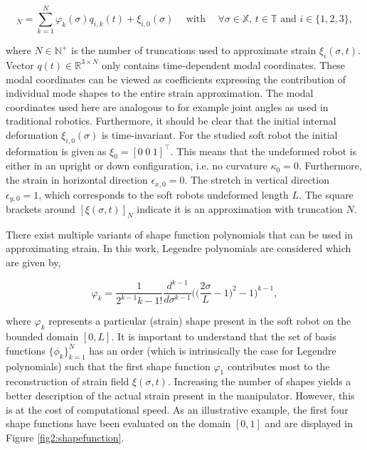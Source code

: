 \begin{equation}
    [\xi_i(\sigma,t)]_N = \sum_{k=1}^N \varphi_k(\sigma)q_{i,k}(t) + \xi_{i,0}(\sigma) \hspace{15pt} \text{with} \hspace{15pt} \forall \sigma \in \mathbb{X}, \hspace{2pt} t \in \mathbb{T}  \hspace{4pt} \text{and} \hspace{4pt} i \in \{1,2,3\},
    \label{eq2:strainapprox}
\end{equation}

where $N \in \mathbb{N}^+$ is the number of truncations used to approximate strain $\xi_i(\sigma,t)$. Vector $q(t) \in \mathbb{R}^{3 \times N}$ only contains time-dependent modal coordinates. These modal coordinates can be viewed as coefficients expressing the contribution of individual mode shapes to the entire strain approximation. The modal coordinates used here are analogous to for example joint angles as used in traditional robotics. Furthermore, it should be clear that the initial internal deformation $\xi_{i,0}(\sigma)$ is time-invariant. For the studied soft robot the initial deformation is given as $\xi_0 = [0 \hspace{3pt} 0 \hspace{3pt} 1]^\top$. This means that the undeformed robot is either in an upright or down configuration, i.e. no curvature $\kappa_0 = 0$. Furthermore, the strain in horizontal direction $\epsilon_{x,0} = 0$. The stretch in vertical direction $\epsilon_{y,0} = 1$, which corresponds to the soft robots undeformed length $L$. The square brackets around $[\xi(\sigma,t)]_N$ indicate it is an approximation with truncation $N$. 

There exist multiple variants of shape function polynomials that can be used in approximating strain. In this work, Legendre polynomials are considered which are given by,

\begin{equation}
    \varphi_{k} = \frac{1}{2^{k-1} k-1!} \frac{d^{k-1}}{d\sigma^{k-1}}\Big(\Big(\frac{2\sigma}{L}-1\Big)^2-1\Big)^{k-1},
    \label{eq2:shapefunction}
\end{equation}

where $\varphi_k$ represents a particular (strain) shape present in the soft robot on the bounded domain $[0,L]$. It is important to understand that the set of basis functions $\{\phi_k\}_{k=1}^N$ has an order (which is intrinsically the case for Legendre polynomials) such that the first shape function $\varphi_1$ contributes most to the reconstruction of strain field $\xi(\sigma,t)$. Increasing the number of shapes yields a better description of the actual strain present in the manipulator. However, this is at the cost of computational speed. As an illustrative example, the first four shape functions have been evaluated on the domain $[0,1]$ and are displayed in Figure \ref{fig2:shapefunction}.

